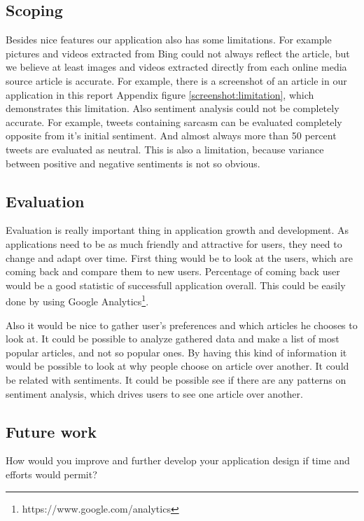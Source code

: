 \documentclass{acm_proc_10ptArticle-sp}
\begin{document}
\subsection{Scoping}

Besides nice features our application also has some limitations. For example pictures and videos extracted from Bing could not always reflect the article, but we believe at least images and videos extracted directly from each online media source article is accurate. For example, there is a screenshot of an article in our application in this report Appendix figure \ref{screenshot:limitation}, which demonstrates this limitation. Also sentiment analysis could not be completely accurate. For example, tweets containing sarcasm can be evaluated completely opposite from it's initial sentiment. And almost always more than 50 percent tweets are evaluated as neutral. This is also a limitation, because variance between positive and negative sentiments is not so obvious.

\subsection{Evaluation}

Evaluation is really important thing in application growth and development. As applications need to be as much friendly and attractive for users, they need to change and adapt over time. First thing would be to look at the users, which are coming back and compare them to new users. Percentage of coming back user would be a good statistic of successfull application overall. This could be easily done by using Google Analytics\footnote{https://www.google.com/analytics}.

Also it would be nice to gather user's preferences and which articles he chooses to look at. It could be possible to analyze gathered data and make a list of most popular articles, and not so popular ones. By having this kind of information it would be possible to look at why people choose on article over another. It could be related with sentiments. It could be possible see if there are any patterns on sentiment analysis, which drives users to see one article over another.

\subsection{Future work}

How would you improve and further develop your application design if time  and efforts would permit?
\end{document}
